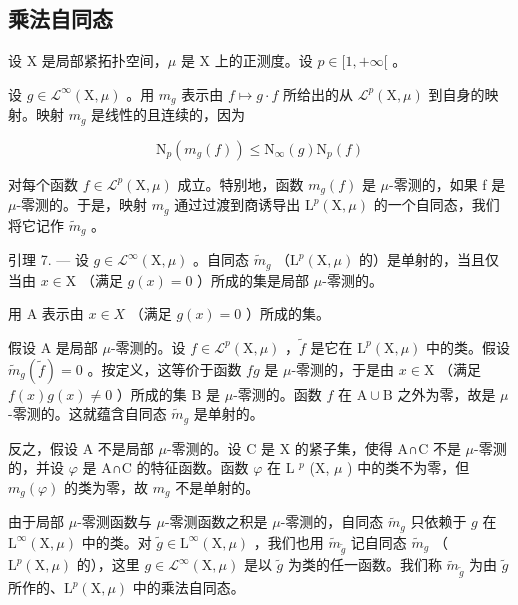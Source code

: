 \subsection{乘法自同态}

设 X 是局部紧拓扑空间，\(\mu\) 是 X 上的正测度。设 \(p \in [1, +\infty[\) 。

设 \(g \in \mathcal{L}^{\infty}(\mathrm{X},\mu)\) 。用 \(m_{g}\) 表示由 \(f \mapsto g \cdot f\) 所给出的从 \(\mathcal{L}^{p}(\mathrm{X},\mu)\) 到自身的映射。映射 \(m_{g}\) 是线性的且连续的，因为

\[
\mathrm{N} _ {p} (m _ {g} (f)) \leqslant \mathrm{N} _ {\infty} (g) \mathrm{N} _ {p} (f)\tag{1}
\]

对每个函数 \(f \in \mathcal{L}^{p}(\mathrm{X}, \mu)\) 成立。特别地，函数 \(m_{g}(f)\) 是 \(\mu\)-零测的，如果 f 是 \(\mu\)-零测的。于是，映射 \(m_{g}\) 通过过渡到商诱导出 \(\mathrm{L}^{p}(\mathrm{X}, \mu)\) 的一个自同态，我们将它记作 \(\widetilde{m}_{g}\) 。

引理 7. --- 设 \(g \in \mathcal{L}^{\infty}(\mathrm{X},\mu)\) 。自同态 \(\tilde{m}_g\) （\(\mathrm{L}^{p}(\mathrm{X},\mu)\) 的）是单射的，当且仅当由 \(x \in \mathrm{X}\) （满足 \(g(x) = 0\) ）所成的集是局部 \(\mu\)-零测的。

用 A 表示由 \(x \in X\) （满足 \(g(x) = 0\) ）所成的集。

假设 A 是局部 \(\mu\)-零测的。设 \(f \in \mathcal{L}^p(\mathrm{X}, \mu)\) ，\(\widetilde{f}\) 是它在 \(\mathrm{L}^p(\mathrm{X}, \mu)\) 中的类。假设 \(\widetilde{m}_g(\widetilde{f}) = 0\) 。按定义，这等价于函数 \(fg\) 是 \(\mu\)-零测的，于是由 \(x \in \mathrm{X}\) （满足 \(f(x)g(x) \neq 0\) ）所成的集 B 是 \(\mu\)-零测的。函数 \(f\) 在 \(\mathrm{A} \cup \mathrm{B}\) 之外为零，故是 \(\mu\)-零测的。这就蕴含自同态 \(\widetilde{m}_g\) 是单射的。

反之，假设 A 不是局部 \(\mu\)-零测的。设 C 是 X 的紧子集，使得 A∩C 不是 \(\mu\)-零测的，并设 \(\varphi\) 是 A∩C 的特征函数。函数 \(\varphi\) 在 L \(^{p}\) (X, \(\mu\) ) 中的类不为零，但 \(m_{g}(\varphi)\) 的类为零，故 \(m_{g}\) 不是单射的。

由于局部 \(\mu\)-零测函数与 \(\mu\)-零测函数之积是 \(\mu\)-零测的，自同态 \(\widetilde{m}_g\) 只依赖于 \(g\) 在 \(\mathrm{L}^{\infty}(\mathrm{X},\mu)\) 中的类。对 \(\widetilde{g}\in \mathrm{L}^{\infty}(\mathrm{X},\mu)\) ，我们也用 \(\widetilde{m}_{\widetilde{g}}\) 记自同态 \(\widetilde{m}_g\) （\(\mathrm{L}^p (\mathrm{X},\mu)\) 的），这里 \(g\in \mathcal{L}^{\infty}(\mathrm{X},\mu)\) 是以 \(\widetilde{g}\) 为类的任一函数。我们称 \(\widetilde{m}_{\widetilde{g}}\) 为由 \(\widetilde{g}\) 所作的、\(\mathrm{L}^p (\mathrm{X},\mu)\) 中的乘法自同态。

